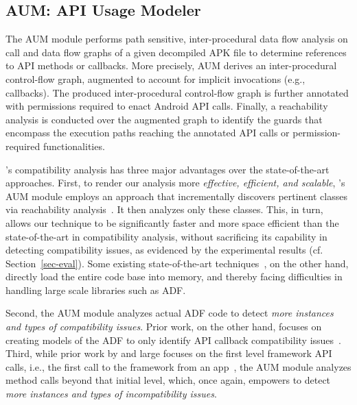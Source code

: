 \subsection{AUM: API Usage Modeler}
\label{API Usage Extraction}

The AUM module performs path sensitive, inter-procedural
data flow analysis on call and data flow graphs of a given
decompiled APK file to determine references to API methods
or callbacks.  More precisely, AUM derives an
inter-procedural control-flow graph, augmented to account
for implicit invocations (e.g., callbacks). The produced inter-procedural
control-flow graph is further annotated with permissions
required to enact Android API calls. Finally, a reachability
analysis is conducted over the augmented graph to identify
the guards that encompass the execution paths reaching the
annotated API calls or permission-required functionalities. 


\@approach's compatibility analysis has three major
advantages over the state-of-the-art approaches.  First,  to
render our analysis more \emph{effective, efficient, and
scalable}, 
\@approach's AUM module employs an approach that
incrementally discovers pertinent classes via reachability
analysis~\cite{tsutano2017efficient}.  It then analyzes only
these classes. This, in turn, allows our technique to be
significantly faster and more space efficient than the
state-of-the-art in compatibility analysis, without
sacrificing its capability in detecting compatibility
issues, as evidenced by the experimental results (cf.
Section~\ref{sec-eval}).  Some existing state-of-the-art
techniques~\cite{huang2018understanding,he2018understanding},
on the other hand, directly load the entire code base into
memory, and thereby facing difficulties in handling large
scale libraries such as ADF. 


Second, the AUM module analyzes actual ADF code to detect
\emph{more instances and types of compatibility issues}.
Prior work, on the other hand, focuses on creating models of
the ADF to only identify API callback compatibility
issues~\cite{huang2018understanding}.  Third, while prior
work by and large focuses on the first level framework API
calls, i.e., the first call to the framework from an
app~\cite{lili2018cid}, the AUM module analyzes method calls
beyond that initial level, which, once again, empowers
\@approach to detect \emph{more instances and types of
incompatibility issues}. 

